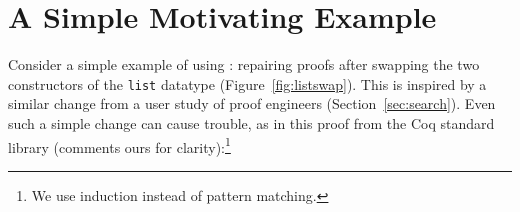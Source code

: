 \section{A Simple Motivating Example}
\label{sec:overview}

\begin{figure*}
\begin{minipage}{0.46\textwidth}
   
\end{minipage}
\hfill
\begin{minipage}{0.46\textwidth}
   
\end{minipage}
\vspace{-0.4cm}
\caption{A change from the old version of \lstinline{list} (left) to the new version of \lstinline{list} (right).
The old version of \lstinline{list} is an inductive datatype that is either empty (the \lstinline{nil} constructor), or the result
of placing an element in front of another \lstinline{list} (the \lstinline{cons} constructor). The change swaps these
two constructors ().}
\label{fig:listswap}
\end{figure*}

\begin{figure*}
\vspace{-0.3cm}
\caption{Two functions between \lstinline{Old.list} and \lstinline{New.list} (top) that form an equivalence (bottom).}
\label{fig:equivalence}
\end{figure*}

Consider a simple example of using \toolname: repairing proofs after swapping the two constructors of the \lstinline{list} datatype (Figure~\ref{fig:listswap}).
This is inspired by a similar change from a user study of proof engineers (Section~\ref{sec:search}).
Even such a simple change can cause trouble, as in this proof from the Coq standard library (comments ours for clarity):\footnote{We use induction instead of pattern matching.}

